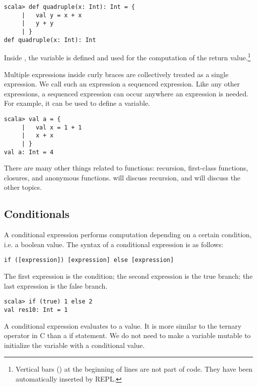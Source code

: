 \begin{verbatim}
scala> def quadruple(x: Int): Int = {
     |   val y = x + x
     |   y + y
     | }
def quadruple(x: Int): Int
\end{verbatim}

Inside , the variable  is defined and used for the
computation of
the return value.\footnote{Vertical bars (\code{|}) at the beginning of lines are
not part of code. They have been automatically inserted by REPL.}

Multiple expressions inside curly braces are collectively treated as a single
expression. We call such an expression a sequenced expression. Like any other
expressions, a sequenced expression can occur anywhere an expression is needed.
For example, it can be used to define a variable.

\begin{verbatim}
scala> val a = {
     |   val x = 1 + 1
     |   x + x
     | }
val a: Int = 4
\end{verbatim}

There are many other things related to functions: recursion, first-class
functions, closures, and anonymous functions.  will
discuss recursion, and  will discuss the other topics.

\subsection{Conditionals}

A conditional expression performs computation depending on a certain
condition, i.e. a boolean value. The syntax of a conditional expression is as
follows:

\begin{verbatim}
if ([expression]) [expression] else [expression]
\end{verbatim}

The first expression is the condition; the second expression is the true branch;
the last expression is the false branch.

\begin{verbatim}
scala> if (true) 1 else 2
val res10: Int = 1
\end{verbatim}

A conditional expression evaluates to a value. It is more similar to the ternary
operator  in C than a if statement.
We do not need to make a variable
mutable to initialize the variable with a conditional value.

